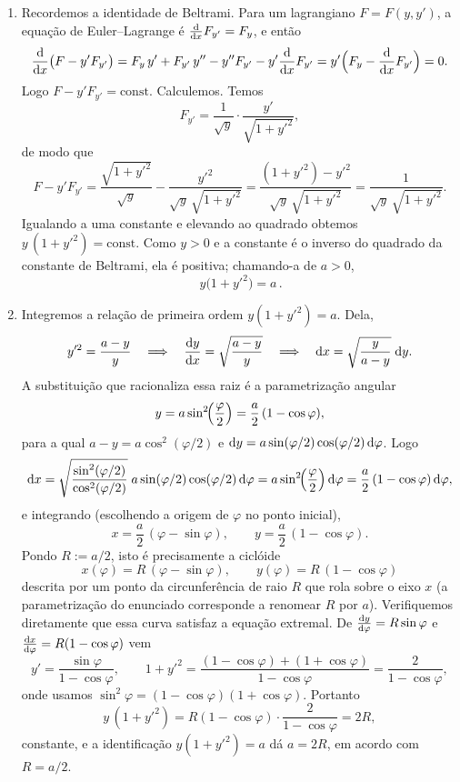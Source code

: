 \begin{enumerate}[label=(\alph*)]
\item Recordemos a identidade de Beltrami. Para um lagrangiano $F=F(y,y')$, a
equação de Euler--Lagrange é $\frac{\mathrm{d}}{\mathrm{d} x}F_{y'}=F_y$, e então
\[
    \frac{\mathrm{d}}{\mathrm{d} x}\bigl(F-y'F_{y'}\bigr)
    =F_y\,y'+F_{y'}\,y''-y''F_{y'}-y'\frac{\mathrm{d}}{\mathrm{d} x}F_{y'}
    =y'\Bigl(F_y-\frac{\mathrm{d}}{\mathrm{d} x}F_{y'}\Bigr)=0 .
\]
Logo $F-y'F_{y'}=\text{const}$. Calculemos. Temos
\[
    F_{y'}=\frac{1}{\sqrt{y}}\cdot\frac{y'}{\sqrt{1+y'^2}},
\]
de modo que
\[
    F-y'F_{y'}
    =\frac{\sqrt{1+y'^2}}{\sqrt{y}}-\frac{y'^2}{\sqrt{y}\,\sqrt{1+y'^2}}
    =\frac{(1+y'^2)-y'^2}{\sqrt{y}\,\sqrt{1+y'^2}}
    =\frac{1}{\sqrt{y}\,\sqrt{1+y'^2}}.
\]
Igualando a uma constante e elevando ao quadrado obtemos
$y\,(1+y'^2)=\text{const}$. Como $y>0$ e a constante é o inverso do quadrado da
constante de Beltrami, ela é positiva; chamando-a de $a>0$,
\[
    \boxed{\,y\bigl(1+y'^2\bigr)=a\,}.
\]

\item Integremos a relação de primeira ordem $y(1+y'^2)=a$. Dela,
\[
    y'^2=\frac{a-y}{y}
    \quad\Longrightarrow\quad
    \frac{\mathrm{d} y}{\mathrm{d} x}=\sqrt{\frac{a-y}{y}}
    \quad\Longrightarrow\quad
    \mathrm{d} x=\sqrt{\frac{y}{a-y}}\;\mathrm{d} y .
\]
A substituição que racionaliza essa raiz é a parametrização angular
\[
    y=a\sin^2\!\Bigl(\frac{\varphi}{2}\Bigr)=\frac{a}{2}\,(1-\cos\varphi),
\]
para a qual $a-y=a\cos^2(\varphi/2)$ e $\mathrm{d} y=a\sin(\varphi/2)\cos(\varphi/2)\,\mathrm{d}\varphi$.
Logo
\[
    \mathrm{d} x=\sqrt{\frac{\sin^2(\varphi/2)}{\cos^2(\varphi/2)}}\;
         a\sin(\varphi/2)\cos(\varphi/2)\,\mathrm{d}\varphi
        =a\sin^2\!\Bigl(\frac{\varphi}{2}\Bigr)\,\mathrm{d}\varphi
        =\frac{a}{2}\,(1-\cos\varphi)\,\mathrm{d}\varphi,
\]
e integrando (escolhendo a origem de $\varphi$ no ponto inicial),
\[
    x=\frac{a}{2}\,(\varphi-\sin\varphi),
    \qquad
    y=\frac{a}{2}\,(1-\cos\varphi).
\]
Pondo $R:=a/2$, isto é precisamente a ciclóide
\[
    \boxed{\;x(\varphi)=R\,(\varphi-\sin\varphi),
        \qquad y(\varphi)=R\,(1-\cos\varphi)\;}
\]
descrita por um ponto da circunferência de raio $R$ que rola sobre o eixo $x$ (a
parametrização do enunciado corresponde a renomear $R$ por $a$). Verifiquemos
diretamente que essa curva satisfaz a equação extremal. De
$\frac{\mathrm{d} y}{\mathrm{d}\varphi}=R\sin\varphi$ e
$\frac{\mathrm{d} x}{\mathrm{d}\varphi}=R(1-\cos\varphi)$ vem
\[
    y'=\frac{\sin\varphi}{1-\cos\varphi},
    \qquad
    1+y'^2=\frac{(1-\cos\varphi)+(1+\cos\varphi)}{1-\cos\varphi}
          =\frac{2}{1-\cos\varphi},
\]
onde usamos $\sin^2\varphi=(1-\cos\varphi)(1+\cos\varphi)$. Portanto
\[
    y\,(1+y'^2)=R(1-\cos\varphi)\cdot\frac{2}{1-\cos\varphi}=2R,
\]
constante, e a identificação $y(1+y'^2)=a$ dá $a=2R$, em acordo com $R=a/2$.


\end{enumerate}
